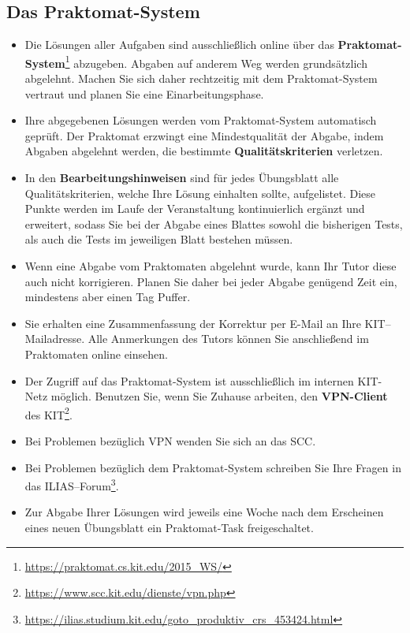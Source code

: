 \subsection*{Das Praktomat-System}
\begin{itemize}
	\item Die Lösungen aller Aufgaben sind ausschließlich online über das
	\textbf{Praktomat-System}\footnote{\url{https://praktomat.cs.kit.edu/2015_WS/}}
	abzugeben. Abgaben auf anderem Weg werden grundsätzlich abgelehnt. Machen Sie sich daher rechtzeitig mit dem Praktomat-System vertraut und planen Sie eine Einarbeitungsphase.
	\item Ihre abgegebenen Lösungen werden vom Praktomat-System automatisch geprüft. Der Praktomat erzwingt eine Mindestqualität der Abgabe, indem Abgaben abgelehnt werden, die bestimmte \textbf{Qualitätskriterien} verletzen. 
	\item In den \textbf{Bearbeitungshinweisen} sind für jedes Übungsblatt alle Qualitätskriterien, welche Ihre Lösung einhalten sollte, aufgelistet. Diese Punkte werden im Laufe der Veranstaltung kontinuierlich ergänzt und erweitert, sodass Sie bei der Abgabe eines Blattes sowohl die bisherigen Tests, als auch die Tests im jeweiligen Blatt bestehen müssen.
	\item Wenn eine Abgabe vom Praktomaten abgelehnt wurde, kann Ihr Tutor diese auch nicht korrigieren. Planen Sie daher bei jeder Abgabe genügend Zeit ein, mindestens aber einen Tag Puffer. 
	\item Sie erhalten eine Zusammenfassung der Korrektur per E-Mail an Ihre KIT--Mailadresse. Alle Anmerkungen des Tutors können Sie anschließend im Praktomaten online einsehen.
	\item Der Zugriff auf das Praktomat-System ist ausschließlich im internen KIT-Netz möglich. Benutzen Sie, wenn Sie Zuhause arbeiten, den \textbf{VPN-Client} des KIT\footnote{\url{https://www.scc.kit.edu/dienste/vpn.php}}. 
	\item Bei Problemen bezüglich VPN wenden Sie sich an das SCC.
	\item Bei Problemen bezüglich dem Praktomat-System schreiben Sie Ihre Fragen in
	das ILIAS--Forum\footnote{\url{https://ilias.studium.kit.edu/goto_produktiv_crs_453424.html}}.
	\item Zur Abgabe Ihrer Lösungen wird jeweils eine Woche nach dem Erscheinen eines neuen Übungsblatt ein Praktomat-Task freigeschaltet.
\end{itemize}

